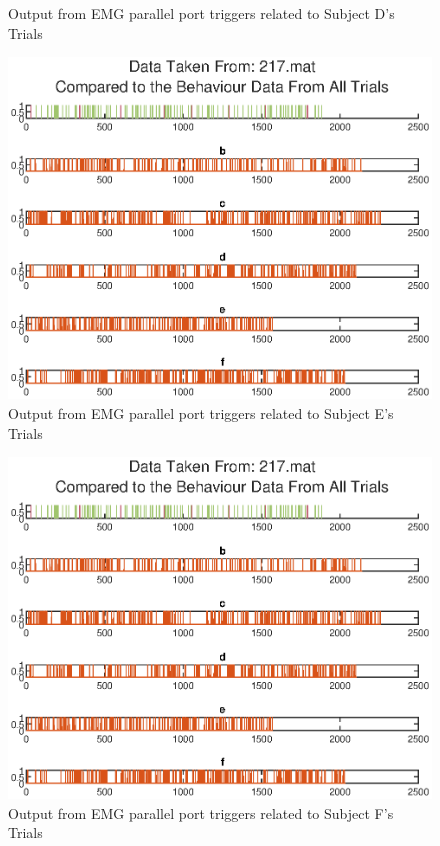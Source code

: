 \begin{appendices}
\begin{figure}[H]
    \caption{Output from EMG parallel port triggers related to Subject D's Trials}
    \label{fig:EMG_Trace_D}
\end{figure}
\begin{figure}[H]
    \centering
    \includegraphics[width=0.75\linewidth]{figures/EMG_Trigger_Comparison_e}
    \caption{Output from EMG parallel port triggers related to Subject E's Trials}
    \label{fig:EMG_Trace_E}
\end{figure}
\begin{figure}[H]
    \centering
    \includegraphics[width=0.75\linewidth]{figures/EMG_Trigger_Comparison_e}
    \caption{Output from EMG parallel port triggers related to Subject F's Trials}
    \label{fig:EMG_Trace_F}
\end{figure}

\end{appendices}